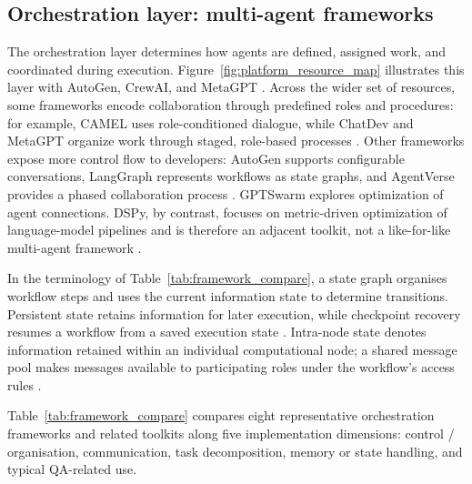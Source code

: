 \documentclass[a4paper,fleqn]{cas-dc}
\begin{document}
\subsection{Orchestration layer: multi-agent frameworks}
\label{sec:framework_compare}

The orchestration layer determines how agents are defined, assigned work, and
coordinated during execution. Figure~\ref{fig:platform_resource_map}
illustrates this layer with AutoGen, CrewAI, and MetaGPT
\citep{wu2024autogen,crewai2023,hong2024metagpt}. Across the wider set of
resources, some frameworks encode collaboration through predefined roles and
procedures: for example, CAMEL uses role-conditioned dialogue, while ChatDev
and MetaGPT organize work through staged, role-based processes
\citep{li2023camel,qian2023chatdev,hong2024metagpt}. Other frameworks expose
more control flow to developers: AutoGen supports configurable conversations,
LangGraph represents workflows as state graphs, and AgentVerse provides a
phased collaboration process \citep{wu2024autogen,duan2024langgraph_crewai,
chen2024agentverse}. GPTSwarm explores optimization of agent connections.
DSPy, by contrast, focuses on metric-driven optimization of language-model
pipelines and is therefore an adjacent toolkit, not a like-for-like
multi-agent framework \citep{zhuge2024gptswarm,khattab2024dspy}.

In the terminology of Table~\ref{tab:framework_compare}, a state graph
organises workflow steps and uses the current information state to determine
transitions. Persistent state retains information for later execution, while
checkpoint recovery resumes a workflow from a saved execution state
\citep{langgraph2024,langgraph2024interrupt}. Intra-node state denotes
information retained within an individual computational node; a shared
message pool makes messages available to participating roles under the
workflow's access rules \citep{zhuge2024gptswarm,hong2024metagpt}.

Table~\ref{tab:framework_compare} compares eight representative orchestration
frameworks and related toolkits along five implementation dimensions: control / organisation, communication,
task decomposition, memory or state handling, and typical QA-related use.
\end{document}
